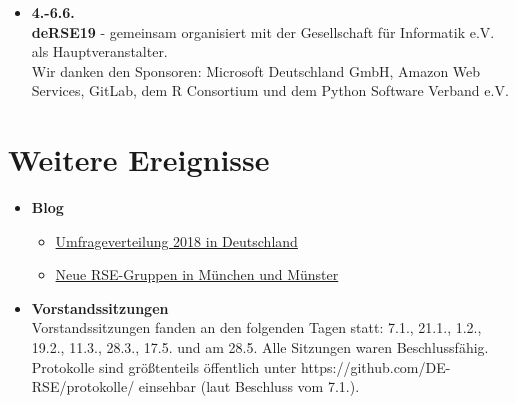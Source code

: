 \begin{itemize}
 \item \textbf{4.-6.6.}\\
 \textbf{deRSE19} - gemeinsam organisiert mit der Gesellschaft für Informatik e.V. als Hauptveranstalter.\\
 Wir danken den Sponsoren: Microsoft Deutschland GmbH, Amazon Web Services, GitLab, dem R Consortium und dem Python Software Verband e.V.
\end{itemize}

\section{Weitere Ereignisse}

\begin{itemize}
 \item \textbf{Blog}
 \begin{itemize}
  \item \href{https://www.de-rse.org/blog/2019/01/29/umfrageverteilung-2018-in-deutschland.html}{Umfrageverteilung 2018 in Deutschland}
  \item \href{https://www.de-rse.org/blog/2019/02/26/new-rse-groups-meet-in-munich-and-muenster.html}{Neue RSE-Gruppen in München und Münster}
 \end{itemize}
 \item \textbf{Vorstandssitzungen}\\
  Vorstandssitzungen fanden an den folgenden Tagen statt: 7.1., 21.1., 1.2., 19.2., 11.3., 28.3., 17.5. und am 28.5. Alle Sitzungen waren Beschlussfähig. Protokolle sind größtenteils öffentlich unter https://github.com/DE-RSE/protokolle/ einsehbar (laut Beschluss vom 7.1.).
\end{itemize}




